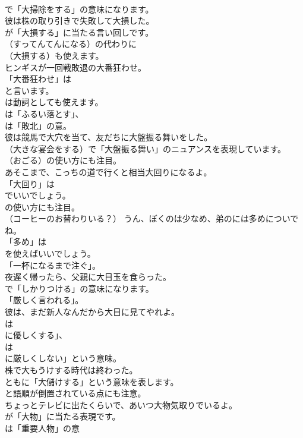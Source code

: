 \documentclass[8pt]{extreport}
\begin{document}
\begin{CJK}{UTF8}{min}
\\	で「大掃除をする」の意味になります。	
\\	彼は株の取り引きで失敗して大損した。 
\\	が「大損する」に当たる言い回しです。
\\	（すってんてんになる）の代わりに 
\\	（大損する）も使えます。	
\\	ヒンギスが一回戦敗退の大番狂わせ。 
\\	「大番狂わせ」は
\\	と言います。
\\	は動詞としても使えます。
\\	は「ふるい落とす」、
\\	は「敗北」の意。	
\\	彼は競馬で大穴を当て、友だちに大盤振る舞いをした。 
\\	（大きな宴会をする）で「大盤振る舞い」のニュアンスを表現しています。
\\	（おごる）の使い方にも注目。	
\\	あそこまで、こっちの道で行くと相当大回りになるよ。 
\\	「大回り」は
\\	でいいでしょう。
\\	の使い方にも注目。	
\\	（コーヒーのお替わりいる？） うん、ぼくのは少なめ、弟のには多めについでね。 
\\	「多め」は
\\	を使えばいいでしょう。
\\	「一杯になるまで注ぐ」。	
\\	夜遅く帰ったら、父親に大目玉を食らった。 
\\	で「しかりつける」の意味になります。
\\	「厳しく言われる」。	
\\	彼は、まだ新人なんだから大目に見てやれよ。 
\\	は
\\	に優しくする」、
\\	は
\\	に厳しくしない」という意味。	
\\	株で大もうけする時代は終わった。 
\\	ともに「大儲けする」という意味を表します。
\\	と語順が倒置されている点にも注意。	
\\	ちょっとテレビに出たくらいで、あいつ大物気取りでいるよ。 
\\	が「大物」に当たる表現です。
\\	は「重要人物」の意	

\end{CJK}
\end{document}
